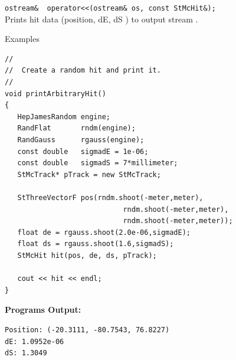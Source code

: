 \begin{Entry}
    \verb+ostream&  operator<<(ostream& os, const StMcHit&);+\\
    Prints hit data (position, dE, dS ) to output stream .

\item[Examples]
{\footnotesize
\begin{verbatim}
//
//  Create a random hit and print it.
//
void printArbitraryHit()
{
   HepJamesRandom engine;
   RandFlat       rndm(engine);
   RandGauss      rgauss(engine);
   const double   sigmadE = 1e-06;
   const double   sigmadS = 7*millimeter;
   StMcTrack* pTrack = new StMcTrack;

   StThreeVectorF pos(rndm.shoot(-meter,meter),
                            rndm.shoot(-meter,meter),
                            rndm.shoot(-meter,meter));
   float de = rgauss.shoot(2.0e-06,sigmadE);
   float ds = rgauss.shoot(1.6,sigmadS);
   StMcHit hit(pos, de, ds, pTrack);

   cout << hit << endl;
}
\end{verbatim}
}%
{\bf Programs Output:}
{\footnotesize
\begin{verbatim}
Position: (-20.3111, -80.7543, 76.8227)
dE: 1.0952e-06
dS: 1.3049
\end{verbatim}
}%

\end{Entry}
\clearpage
%
%
